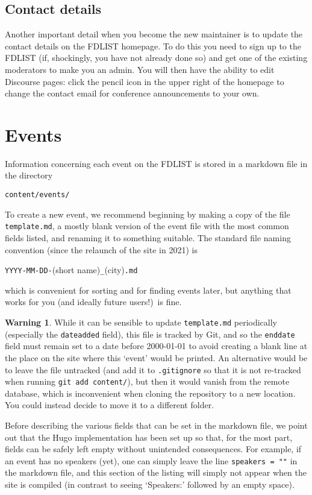 \documentclass[12pt]{scrartcl}
\theoremstyle{definition}
\newtheorem*{warn}{Warning}
\begin{document}
\subsection{Contact details}
Another important detail when you become the new maintainer is to update the contact details on the FDLIST homepage.
To do this you need to sign up to the FDLIST (if, shockingly, you have not already done so) and get one of the existing moderators to make you an admin.
You will then have the ability to edit Discourse pages: click the pencil icon in the upper right of the homepage to change the contact email for conference announcements to your own.

\section{Events}
Information concerning each event on the FDLIST is stored in a markdown file in the directory
\begin{center}
\verb|content/events/|
\end{center}
To create a new event, we recommend beginning by making a copy of the file \verb|template.md|, a mostly blank version of the event file with the most common fields listed, and renaming it to something suitable.
The standard file naming convention (since the relaunch of the site in 2021) is
\begin{center}
\verb|YYYY-MM-DD-|(short name)\verb|_|(city)\verb|.md|
\end{center}
which is convenient for sorting and for finding events later, but anything that works for you (and ideally future users!)\ is fine.

\begin{warn}
While it can be sensible to update \verb|template.md| periodically (especially the \verb|dateadded| field), this file is tracked by Git, and so the \verb|enddate| field must remain set to a date before 2000-01-01 to avoid creating a blank line at the place on the site where this `event' would be printed.
An alternative would be to leave the file untracked (and add it to \verb|.gitignore| so that it is not re-tracked when running \verb|git add content/|), but then it would vanish from the remote database, which is inconvenient when cloning the repository to a new location.
You could instead decide to move it to a different folder.
\end{warn}

Before describing the various fields that can be set in the markdown file, we point out that the Hugo implementation has been set up so that, for the most part, fields can be safely left empty without unintended consequences.
For example, if an event has no speakers (yet), one can simply leave the line \verb|speakers = ""| in the markdown file, and this section of the listing will simply not appear when the site is compiled (in contrast to seeing `Speakers:' followed by an empty space).
\end{document}
